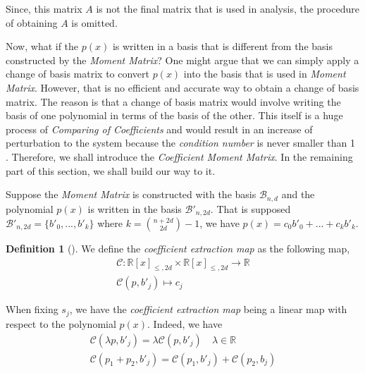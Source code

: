 \documentclass[12pt]{amsart}
\numberwithin{equation}{section}
\theoremstyle{definition}
\newtheorem{definition}[thm]{Definition}
\numberwithin{thm}{section}
\begin{document}
Since, this matrix $A$ is not the final matrix that is used in analysis, the procedure of obtaining $A$ is omitted. 

\smallskip

Now, what if the $p(x)$ is written in a basis that is different from the basis constructed by the \emph{Moment Matrix}?
One might argue that we can simply apply a change of basis matrix to convert $p(x)$ into the basis that is used in \emph{Moment Matrix}. 
However, that is no efficient and accurate way to obtain a change of basis matrix. 
The reason is that a change of basis matrix would involve writing the basis of one polynomial in terms of the basis of the other. 
This itself is a huge process of \emph{Comparing of Coefficients} and would result in an increase of perturbation to the system because the \emph{condition number} is never smaller than 1 \cite{golub1996matrix}.
Therefore, we shall introduce the \emph{Coefficient Moment Matrix}. In the remaining part of this section, we shall build our way to it.

Suppose the \emph{Moment Matrix} is constructed with the basis $\mathcal{B}_{n, d}$ and the polynomial $p(x)$ is written in the basis $\mathcal{B}'_{n, 2d}$. 
That is supposed $\mathcal{B}'_{n, 2d} = \{b'_0, ..., b'_k\}$ where $k = {n + 2d \choose 2d} - 1$, we have $p(x) = c_0b'_0 + ... + c_kb'_k$.
\begin{definition}[\cite{Recher:Masterthesis}]
     \label{def:cem}
We define the \emph{coefficient extraction map} as the following map,
\begin{equation*}
     \begin{split}
     \mathcal{C}: \mathbb{R}[x]_{\leq, 2d} \times \mathbb{R}[x]_{\leq, 2d} \rightarrow \mathbb{R} \\
     \mathcal{C}(p, b'_j) \mapsto c_j
     \end{split}
\end{equation*}
\end{definition}

\smallskip
When fixing $s_j$, we have the \emph{coefficient extraction map} being a linear map with respect to the polynomial $p(x)$. Indeed, we have 
\begin{equation*}
     \begin{split}
          \mathcal{C}(\lambda p, b'_j) = \lambda \mathcal{C}(p, b'_j) \quad \lambda \in \mathbb{R}
          \\
          \mathcal{C}(p_1 + p_2, b'_j) = \mathcal{C}(p_1, b'_j) + \mathcal{C}(p_2, b_j)
     \end{split}
\end{equation*}
\end{document}
